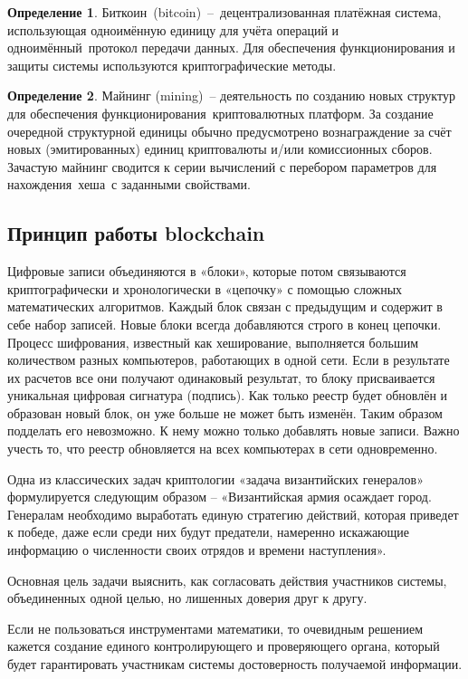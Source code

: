 \documentclass[och, master, pract]{SCWorks_fix}
\theoremstyle{plain}
\theoremstyle{plain}
\theoremstyle{plain}
\theoremstyle{definition}
\newtheorem{defn}{Определение}
\begin{document}
\begin{defn}
Биткоин (bitcoin) – децентрализованная платёжная система, использующая одноимённую единицу для учёта операций и одноимённый протокол передачи данных. Для обеспечения функционирования и защиты системы используются криптографические методы.
\end{defn}

\begin{defn}
Майнинг (mining) – деятельность по созданию новых структур для обеспечения функционирования криптовалютных платформ. За создание очередной структурной единицы обычно предусмотрено вознаграждение за счёт новых (эмитированных) единиц криптовалюты и/или комиссионных сборов. Зачастую майнинг сводится к серии вычислений с перебором параметров для нахождения хеша с заданными свойствами. 
\end{defn}

\subsection{Принцип работы blockchain}

Цифровые записи объединяются в «блоки», которые потом связываются криптографически и хронологически в «цепочку» с помощью сложных математических алгоритмов. Каждый блок связан с предыдущим и содержит в себе набор записей. Новые блоки всегда добавляются строго в конец цепочки. Процесс шифрования, известный как хеширование, выполняется большим количеством разных компьютеров, работающих в одной сети. Если в результате их расчетов все они получают одинаковый результат, то блоку присваивается уникальная цифровая сигнатура (подпись). Как только реестр будет обновлён и образован новый блок, он уже больше не может быть изменён. Таким образом подделать его невозможно. К нему можно только добавлять новые записи. Важно учесть то, что реестр обновляется на всех компьютерах в сети одновременно.

Одна из классических задач криптологии «задача византийских генералов» формулируется следующим образом – «Византийская армия осаждает город. Генералам необходимо выработать единую стратегию действий, которая приведет к победе, даже если среди них будут предатели, намеренно искажающие информацию о численности своих отрядов и времени наступления».

Основная цель задачи выяснить, как согласовать действия участников системы, объединенных одной целью, но лишенных доверия друг к другу.

Если не пользоваться инструментами математики, то очевидным решением кажется создание единого контролирующего и проверяющего органа, который будет гарантировать участникам системы достоверность получаемой информации.
 
\end{document}
